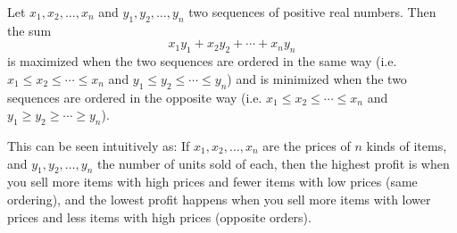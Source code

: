 \documentclass[12pt]{article}
\begin{document}
Let $x_1,x_2,\ldots,x_n$ and $y_1,y_2,\ldots,y_n$ two sequences of positive real numbers.
Then the sum
$$x_1y_1+x_2y_2+\cdots+x_ny_n$$
is maximized when the two sequences are ordered in the same way (i.e. $x_1\le x_2\le \cdots \le x_n$ and $y_1\le y_2\le\cdots\le y_n$) and is minimized when the two sequences are ordered in the opposite way (i.e. $x_1\le x_2\le \cdots \le x_n$ and $y_1\ge y_2\ge\cdots\ge y_n$).
\bigskip

This can be seen intuitively as:
If $x_1,x_2,\ldots,x_n$ are the prices of $n$ kinds of items, and $y_1,y_2,\ldots,y_n$ the number of units sold of each, then the highest profit is when you sell more items with high prices and fewer items with low prices (same ordering), and the lowest profit happens when you sell more items with lower prices and less items with high prices (opposite orders).
\end{document}
